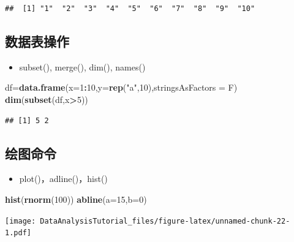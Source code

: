 \documentclass[]{book}
\newenvironment{Shaded}{\begin{snugshade}}{\end{snugshade}}
\newcommand{\DataTypeTok}[1]{\textcolor[rgb]{0.13,0.29,0.53}{#1}}
\newcommand{\DecValTok}[1]{\textcolor[rgb]{0.00,0.00,0.81}{#1}}
\newcommand{\KeywordTok}[1]{\textcolor[rgb]{0.13,0.29,0.53}{\textbf{#1}}}
\newcommand{\NormalTok}[1]{#1}
\newcommand{\OperatorTok}[1]{\textcolor[rgb]{0.81,0.36,0.00}{\textbf{#1}}}
\newcommand{\StringTok}[1]{\textcolor[rgb]{0.31,0.60,0.02}{#1}}
\providecommand{\tightlist}{%
  \setlength{\itemsep}{0pt}\setlength{\parskip}{0pt}}
\begin{document}
\begin{verbatim}
##  [1] "1"  "2"  "3"  "4"  "5"  "6"  "7"  "8"  "9"  "10"
\end{verbatim}

\hypertarget{section-13}{%
\subsection{数据表操作}\label{section-13}}

\begin{itemize}
\tightlist
\item
  subset(), merge(), dim(), names()
\end{itemize}

\begin{Shaded}
\begin{Highlighting}[]
\NormalTok{df=}\KeywordTok{data.frame}\NormalTok{(}\DataTypeTok{x=}\DecValTok{1}\OperatorTok{:}\DecValTok{10}\NormalTok{,}\DataTypeTok{y=}\KeywordTok{rep}\NormalTok{(}\StringTok{"a"}\NormalTok{,}\DecValTok{10}\NormalTok{),}\DataTypeTok{stringsAsFactors =}\NormalTok{ F)}
\KeywordTok{dim}\NormalTok{(}\KeywordTok{subset}\NormalTok{(df,x}\OperatorTok{>}\DecValTok{5}\NormalTok{))}
\end{Highlighting}
\end{Shaded}

\begin{verbatim}
## [1] 5 2
\end{verbatim}

\hypertarget{section-14}{%
\subsection{绘图命令}\label{section-14}}

\begin{itemize}
\tightlist
\item
  plot()，adline()，hist()
\end{itemize}

\begin{Shaded}
\begin{Highlighting}[]
\KeywordTok{hist}\NormalTok{(}\KeywordTok{rnorm}\NormalTok{(}\DecValTok{100}\NormalTok{))}
\KeywordTok{abline}\NormalTok{(}\DataTypeTok{a=}\DecValTok{15}\NormalTok{,}\DataTypeTok{b=}\DecValTok{0}\NormalTok{)}
\end{Highlighting}
\end{Shaded}

\texttt{[image: DataAnalysisTutorial\_files/figure-latex/unnamed-chunk-22-1.pdf]}
\end{document}
